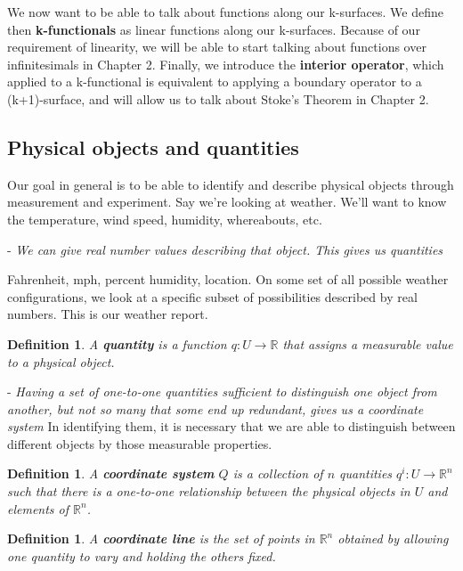 \documentclass{book}
\newtheorem{defn}[equation]{Definition}
\begin{document}
We now want to be able to talk about functions along our k-surfaces. We define then \textbf{k-functionals} as linear functions along our k-surfaces. Because of our requirement of linearity, we will be able to start talking about functions over infinitesimals in Chapter 2. Finally, we introduce the \textbf{interior operator}, which applied to a k-functional is equivalent to applying a boundary operator to a (k+1)-surface, and will allow us to talk about Stoke's Theorem in Chapter 2.  


\subsection{Physical objects and quantities}


Our goal in general is to be able to identify and describe physical objects through measurement and experiment. 
Say we're looking at weather. We'll want to know the temperature, wind speed, humidity, whereabouts, etc.

- \emph{We can give real number values describing that object. This gives us quantities}

Fahrenheit, mph, percent humidity, location.
On some set of all possible weather configurations, we look at a specific subset of possibilities described by real numbers. This is our weather report.  

 

\begin{defn}
	A \textbf{quantity} is a function $q : U \to \mathbb{R}$ that assigns a measurable value to a physical object.
\end{defn}


- \emph{Having a set of one-to-one quantities sufficient to distinguish one object from another, but not so many that some end up redundant, gives us a coordinate system}
In identifying them, it is necessary that we are able to distinguish between different objects by those measurable properties. 

\begin{defn}
	A \textbf{coordinate system} $Q$ is a collection of $n$ quantities $q^i : U \to \mathbb{R}^n$ such that there is a one-to-one relationship between the physical objects in $U$ and elements of $\mathbb{R}^n$.
\end{defn}


\begin{defn}
	A \textbf{coordinate line} is the set of points in $\mathbb{R}^n$ obtained by allowing one quantity to vary and holding the others fixed. 
\end{defn}
\end{document}
